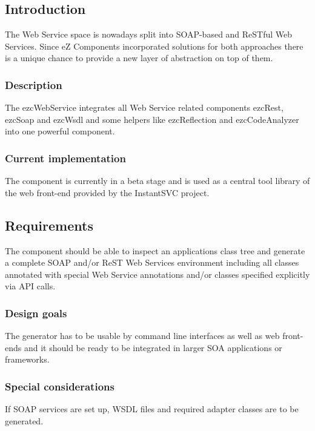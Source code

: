 \documentclass[10pt,final,a4paper,oneside]{article}
\begin{document}
\subsection{Introduction}

The Web Service space is nowadays split
into SOAP-based and ReSTful Web Services.
Since eZ Components incorporated solutions
for both approaches
there is a unique chance to provide a new layer of abstraction
on top of them.

\subsubsection{Description}
The ezcWebService integrates all Web Service related
components ezcRest, ezcSoap and ezcWsdl and some helpers
like ezcReflection and ezcCodeAnalyzer into one powerful component.

\subsubsection{Current implementation}
The component is currently in a beta stage
and is used as a central tool library
of the web front-end provided by the InstantSVC project.

\subsection{Requirements}\label{subsec:WebServiceRequirements}
The component should be able to
inspect an applications class tree
and generate a complete SOAP and/or ReST Web Services environment
including all classes annotated with special Web Service annotations
and/or classes specified explicitly via API calls.

\subsubsection{Design goals}
The generator has to be usable by
command line interfaces as well as web front-ends
and it should be ready to be integrated
in larger SOA applications or frameworks.


\subsubsection{Special considerations}
If SOAP services are set up,
WSDL files and required adapter classes are to be generated.
\end{document}
